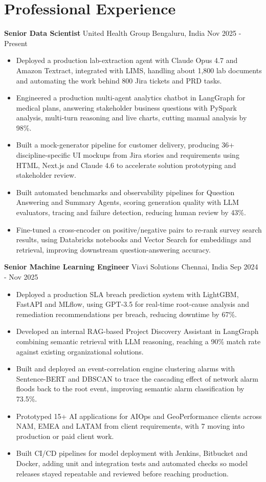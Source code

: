 \documentclass[10pt,a4paper]{article}
\newcommand{\role}[4]{\textbf{#1} \textbar{} #2 \hfill #3 \textbar{} #4\par}
\begin{document}
\section{Professional Experience}
\role{Senior Data Scientist}{United Health Group}{Bengaluru, India}{Nov 2025 - Present}
\begin{itemize}
  \item Deployed a production lab-extraction agent with Claude Opus 4.7 and Amazon Textract, integrated with LIMS, handling about 1,800 lab documents and automating the work behind 800 Jira tickets and PRD tasks.
  \item Engineered a production multi-agent analytics chatbot in LangGraph for medical plans, answering stakeholder business questions with PySpark analysis, multi-turn reasoning and live charts, cutting manual analysis by 98\%.
  \item Built a mock-generator pipeline for customer delivery, producing 36+ discipline-specific UI mockups from Jira stories and requirements using HTML, Next.js and Claude 4.6 to accelerate solution prototyping and stakeholder review.
  \item Built automated benchmarks and observability pipelines for Question Answering and Summary Agents, scoring generation quality with LLM evaluators, tracing and failure detection, reducing human review by 43\%.
  \item Fine-tuned a cross-encoder on positive/negative pairs to re-rank survey search results, using Databricks notebooks and Vector Search for embeddings and retrieval, improving downstream question-answering accuracy.
\end{itemize}
\vspace{3pt}
\role{Senior Machine Learning Engineer}{Viavi Solutions}{Chennai, India}{Sep 2024 - Nov 2025}
\begin{itemize}
  \item Deployed a production SLA breach prediction system with LightGBM, FastAPI and MLflow, using GPT-3.5 for real-time root-cause analysis and remediation recommendations per breach, reducing downtime by 67\%.
  \item Developed an internal RAG-based Project Discovery Assistant in LangGraph combining semantic retrieval with LLM reasoning, reaching a 90\% match rate against existing organizational solutions.
  \item Built and deployed an event-correlation engine clustering alarms with Sentence-BERT and DBSCAN to trace the cascading effect of network alarm floods back to the root event, improving semantic alarm classification by 73.5\%.
  \item Prototyped 15+ AI applications for AIOps and GeoPerformance clients across NAM, EMEA and LATAM from client requirements, with 7 moving into production or paid client work.
  \item Built CI/CD pipelines for model deployment with Jenkins, Bitbucket and Docker, adding unit and integration tests and automated checks so model releases stayed repeatable and reviewed before reaching production.
\end{itemize}
\end{document}
